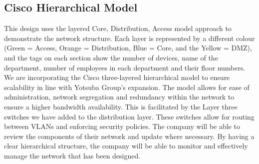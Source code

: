 \documentclass[12pt,oneside]{book}
\begin{document}


\setcounter{page}{2}

\setcounter{page}{2} %
\setcounter{tocdepth}{1}
\tableofcontents
\clearpage


\setcounter{page}{1} %











\clearpage

\begin{doublespace}
  \printbibliography
\end{doublespace}

\begin{appendices}
\chapter{Cisco Hierarchical Model}
\label{appendix:layered-model}
This design uses the layered Core, Distribution, Access model approach to demonstrate the network structure. Each layer is represented by a different colour (Green = Access, Orange = Distribution, Blue = Core, and the Yellow = DMZ), and the tags on each section show the number of devices, name of the department, number of employees in each department and their floor numbers.
We are incorporating the Cisco three-layered hierarchical model to ensure scalability in line with Yotsuba Group's expansion. The model allows for ease of administration, network segregation and redundancy within the network to ensure a higher bandwidth availability. This is facilitated by the Layer three switches we have added to the distribution layer. These switches allow for routing between VLANs and enforcing security policies. The company will be able to review the components of their network and update where necessary. By having a clear hierarchical structure, the company will be able to monitor and effectively manage the network that has been designed.

\end{appendices}
\end{document}
